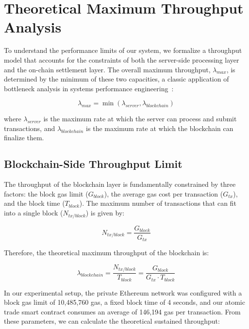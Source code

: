 \section{Theoretical Maximum Throughput Analysis}
\label{sec:theoretical}

To understand the performance limits of our system, we formalize a throughput model that accounts for the constraints of both the server-side processing layer and the on-chain settlement layer. The overall maximum throughput, $\lambda_{max}$, is determined by the minimum of these two capacities, a classic application of bottleneck analysis in systems performance engineering~\cite{harcholbalter2013performance}:

\begin{equation}
\lambda_{max} = \min(\lambda_{server}, \lambda_{blockchain})
\label{eq:lambda_max}
\end{equation}

where $\lambda_{server}$ is the maximum rate at which the server can process and submit transactions, and $\lambda_{blockchain}$ is the maximum rate at which the blockchain can finalize them.

\subsection{Blockchain-Side Throughput Limit}

The throughput of the blockchain layer is fundamentally constrained by three factors: the block gas limit ($G_{block}$), the average gas cost per transaction ($G_{tx}$), and the block time ($T_{block}$). The maximum number of transactions that can fit into a single block ($N_{tx/block}$) is given by:

\begin{equation}
N_{tx/block} = \frac{G_{block}}{G_{tx}}
\end{equation}

Therefore, the theoretical maximum throughput of the blockchain is:

\begin{equation}
\lambda_{blockchain} = \frac{N_{tx/block}}{T_{block}} = \frac{G_{block}}{G_{tx} \cdot T_{block}}
\end{equation}

In our experimental setup, the private Ethereum network was configured with a block gas limit of 10,485,760 gas, a fixed block time of 4 seconds, and our atomic trade smart contract consumes an average of 146,194 gas per transaction. From these parameters, we can calculate the theoretical sustained throughput:

